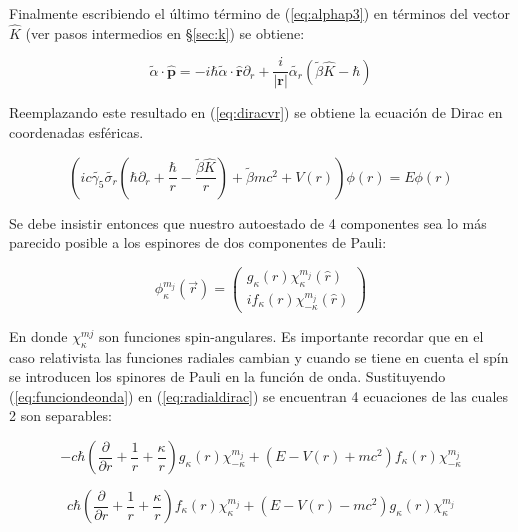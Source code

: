 \documentclass[a4paper, 12pt]{article} %
\begin{document}
Finalmente escribiendo el \'ultimo t\'ermino de (\ref{eq:alphap3}) en t\'erminos
del vector $\hat{K}$ (ver pasos intermedios en \S \ref{sec:k}) se obtiene:

\begin{equation}\label{alphap4}
\widetilde{\alpha} \cdot \mathbf{\hat{p}} = -i\hbar \widetilde{\alpha}\cdot \hat{\mathbf{r}}\partial_r + \dfrac{i}{|\mathbf{r}|} \widetilde{\alpha_r}(\widetilde{\beta}\hat{K}-\hbar)
\end{equation}

Reemplazando este resultado en (\ref{eq:diracvr}) se obtiene la ecuaci\'on de Dirac en coordenadas esf\'ericas.

\begin{equation}\label{eq:radialdirac}
\left (ic\widetilde{\gamma_5}\widetilde{\sigma_r} \left (\hbar \partial_r + \dfrac{\hbar}{r} -  \dfrac{\widetilde{\beta}\hat{K}}{r}\right )  + \widetilde{\beta} m c^2 + V(r) \right ) \phi(r) = E \phi (r)
\end{equation}

Se debe insistir entonces que nuestro autoestado de 4 componentes sea lo m\'as parecido posible a los espinores de dos componentes de Pauli:

\begin{equation}\label{eq:funciondeonda}
\phi^{m_j}_{\kappa} (\vec{r} ) = \left( \substack{g_{\kappa}(r)\chi^{m_j}_\kappa (\hat{r}) \\ if_\kappa(r)\chi^{m_j}_{-\kappa} (\hat{r}) } \right) 
\end{equation}

En donde $\chi_{\kappa}^{mj}$ son funciones spin-angulares. Es importante
recordar que en el caso relativista las funciones radiales cambian y 
cuando se tiene en cuenta el sp\'in se introducen los spinores de Pauli
en la funci\'on de onda. Sustituyendo (\ref{eq:funciondeonda}) en 
(\ref{eq:radialdirac}) se encuentran 4 ecuaciones de las cuales 2 son 
separables:
 

\begin{equation}
-c \hbar  \left( \frac{\partial}{\partial r}+\frac{1}{r}+\frac{\kappa}{r} \right) g_{\kappa}(r)\chi^{m_j}_{-\kappa} +(E-V(r)+mc^2)f_{\kappa}(r)\chi^{m_j}_{-\kappa}
\end{equation}


\begin{equation}
c \hbar  \left( \frac{\partial}{\partial r}+\frac{1}{r}+\frac{\kappa}{r} \right) f_{\kappa}(r)\chi^{m_j}_{\kappa} +(E-V(r)-mc^2)g_{\kappa}(r)\chi^{m_j}_{\kappa}
\end{equation}
\end{document}
